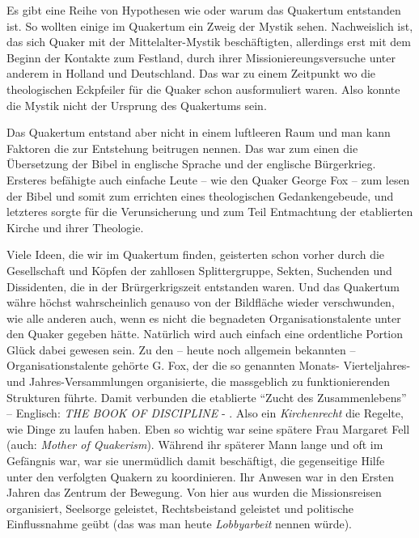 \medskip

Es gibt eine Reihe von Hypothesen wie oder warum das Quakertum entstanden ist.
So
wollten einige im Quakertum ein Zweig der Mystik sehen. Nachweislich ist, das
sich Quaker mit der Mittelalter-Mystik beschäftigten, allerdings erst mit dem
Beginn der Kontakte zum Festland, durch ihrer Missioniereungsversuche unter
anderem in Holland und Deutschland. Das war zu einem Zeitpunkt wo die
theologischen Eckpfeiler für die Quaker schon ausformuliert waren. Also konnte
die Mystik nicht der Ursprung des Quakertums sein.

\medskip

Das Quakertum entstand aber nicht in einem luftleeren Raum und man kann Faktoren
die zur Entstehung beitrugen nennen. Das war zum einen die Übersetzung der Bibel
in englische Sprache und der englische Bürgerkrieg. Ersteres befähigte auch
einfache Leute -- wie den Quaker George Fox -- zum lesen der Bibel und somit zum
errichten eines theologischen Gedankengebeude, und letzteres sorgte für die
Verunsicherung und zum Teil Entmachtung der etablierten Kirche und ihrer
Theologie.

\medskip

Viele Ideen, die wir im Quakertum finden, geisterten schon vorher durch die
Gesellschaft und Köpfen der zahllosen Splittergruppe, Sekten, Suchenden und
Dissidenten, die in der Brürgerkrigszeit entstanden waren. Und das Quakertum
währe höchst wahrscheinlich genauso von der Bildfläche wieder verschwunden, wie
alle anderen auch, wenn es nicht die begnadeten Organisationstalente unter den
Quaker gegeben hätte. Natürlich wird auch einfach eine ordentliche Portion Glück
dabei gewesen sein. Zu den -- heute noch allgemein bekannten --
Organisationstalente gehörte G. Fox, der die so genannten Monats- Vierteljahres-
und Jahres-Versammlungen organisierte, die massgeblich zu funktionierenden
Strukturen führte. Damit verbunden die etablierte "`Zucht des Zusammenlebens"'
--
Englisch: \textit{THE BOOK OF DISCIPLINE} - . Also ein \textit{Kirchenrecht} die
Regelte, wie Dinge zu laufen haben. Eben so wichtig war seine spätere Frau
Margaret Fell (auch: \textit{Mother of Quakerism}). Während ihr späterer Mann
lange und oft im Gefängnis war, war sie unermüdlich damit beschäftigt, die
gegenseitige Hilfe unter den verfolgten Quakern zu koordinieren. Ihr Anwesen
war in den Ersten Jahren das Zentrum der Bewegung. Von hier aus wurden die
Missionsreisen organisiert, Seelsorge geleistet, Rechtsbeistand geleistet und
politische Einflussnahme geübt (das was man heute \textit{Lobbyarbeit} nennen
würde).

